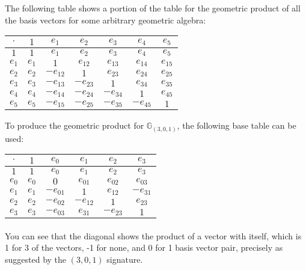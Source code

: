 \documentclass{article}
\newcommand{\mycaption}[2][nolabel]{%
  \ifthenelse{\equal{#1}{label}}{\refstepcounter{table}\caption{#2}\label{table:\thetable}}{\caption*{#2}}%
}
\begin{document}
\begin{enumerate}
    The following table shows a portion of the table for the geometric product of all the basis vectors for some 
    arbitrary geometric algebra:
    \begin{center}
    \begin{tabular}{|c|c|c|c|c|c|c|}
    \hline
    $\cdot$ & $1$ & $e_1$ & $e_2$ & $e_3$ & $e_4$ & $e_5$ \\
    \hline
    $1$ & $1$ & $e_1$ & $e_2$ & $e_3$ & $e_4$ & $e_5$ \\
    \hline
    $e_1$ & $e_1$ & $1$ & $e_{12}$ & $e_{13}$ & $e_{14}$ & $e_{15}$ \\
    \hline
    $e_2$ & $e_2$ & $-e_{12}$ & $1$ & $e_{23}$ & $e_{24}$ & $e_{25}$ \\
    \hline
    $e_3$ & $e_3$ & $-e_{13}$ & $-e_{23}$ & $1$ & $e_{34}$ & $e_{35}$ \\
    \hline
    $e_4$ & $e_4$ & $-e_{14}$ & $-e_{24}$ & $-e_{34}$ & $1$ & $e_{45}$ \\
    \hline
    $e_5$ & $e_5$ & $-e_{15}$ & $-e_{25}$ & $-e_{35}$ & $-e_{45}$ & $1$ \\
    \hline
    \end{tabular}
    \end{center}

    To produce the geometric product for $\mathbb{G}_{(3,0,1)}$, the following base table can be used:
    \begin{center}
    \begin{tabular}{|c|c|c|c|c|c|}
    \hline
    $\cdot$ & $1$ & $e_0$ & $e_1$ & $e_2$ & $e_3$ \\
    \hline
    $1$ & $1$ & $e_0$ & $e_1$ & $e_2$ & $e_3$ \\
    \hline
    $e_0$ & $e_0$ & $0$ & $e_{01}$ & $e_{02}$ & $e_{03}$ \\
    \hline
    $e_1$ & $e_1$ & $-e_{01}$ & $1$ & $e_{12}$ & $-e_{31}$ \\
    \hline
    $e_2$ & $e_2$ & $-e_{02}$ & $-e_{12}$ & $1$ & $e_{23}$ \\
    \hline
    $e_3$ & $e_3$ & $-e_{03}$ & $e_{31}$ & $-e_{23}$ & $1$ \\
    \hline
    \end{tabular}
    \end{center}

    \paragraph{}
        You can see that the diagonal shows the product of a vector with itself, which is 1 for 3 of the vectors,
        -1 for none, and 0 for 1 basis vector pair, precisely as suggested by the $(3,0,1)$ signature.


\end{enumerate}
\end{document}
